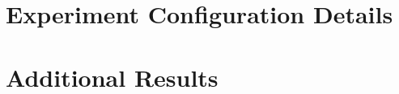 \appendix

\section{Experiment Configuration Details}
\label{sec:appendix-config}


\section{Additional Results}
\label{sec:appendix-results}

